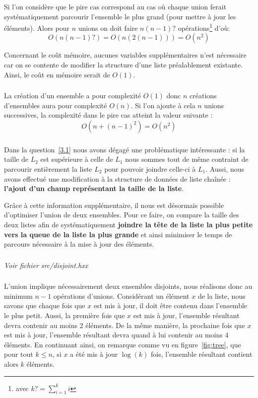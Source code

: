 \documentclass[10pt,a4paper]{article}
\begin{document}
{Si l'on considère que le pire cas correspond au cas où chaque union ferait systématiquement parcourir l'ensemble le plus grand (pour mettre à jour les éléments). Alors pour $n$ unions on doit faire $n(n-1)?$ opérations\footnote{avec $k? = \sum\limits_{i=1}^{k}{i}$} d'où:
$$O(n(n-1)?) =  O(n(2(n-1))) = O(n^2)$$

Concernant le coût mémoire, aucunes variables supplémentaires n'est nécessaire car on se contente de modifier la structure d'une liste préalablement existante. Ainsi, le coût en mémoire serait de $O(1)$.
\subsubsection{}
La création d'un ensemble a pour complexité $O(1)$ donc $n$ créations d'ensembles aura pour complexité $O(n)$. Si l'on ajoute à cela $n$ unions successives, la complexité dans le pire cas atteint la valeur suivante :
$$O(n + (n-1)^2) = O(n^2)$$

\subsubsection{}
Dans la question~\ref{3.1} nous avons dégagé une problématique intéressante : si la taille de $L_{2}$ est supérieure à celle de $L_{1}$ nous sommes tout de même contraint de parcourir entièrement la liste $L_{2}$ pour pouvoir joindre celle-ci à $L_{1}$. Aussi, nous avons effectué une modification à la structure de données de liste chaînée : \textbf{l'ajout d'un champ représentant la taille de la liste}.

Grâce à cette information supplémentaire, il nous est désormais possible d'optimiser l'union de deux ensembles. Pour ce faire, on compare la taille des deux listes afin de systématiquement \textbf{joindre la tête de la liste la plus petite vers la queue de la liste la plus grande} et ainsi minimiser le temps de parcours nécessaire à la mise à jour des éléments.

\subsubsection{}
\textit{Voir fichier src/disjoint.hxx}

\subsubsection{}\label{3.5}
L'union implique nécessairement deux ensembles disjoints, nous réalisons donc au minimum $n-1$ opérations d'unions. Considérant un élément $x$ de la liste, nous savons que chaque fois que $x$ est mis à jour, il doit être contenu dans l'ensemble le plus petit. Aussi, la première fois que $x$ est mis à jour, l'ensemble résultant devra contenir au moins 2 éléments. De la même manière, la prochaine fois que $x$ est mis à jour, l'ensemble résultant devra quand à lui contenir au moins 4 éléments. En continuant ainsi, on remarque comme vu en figure~\ref{fig:tree}, que pour tout $k \leq n$, si $x$ a été mis à jour $\log(k)$ fois, l'ensemble résultant contient alors $k$ éléments.\\

}
\end{document}
